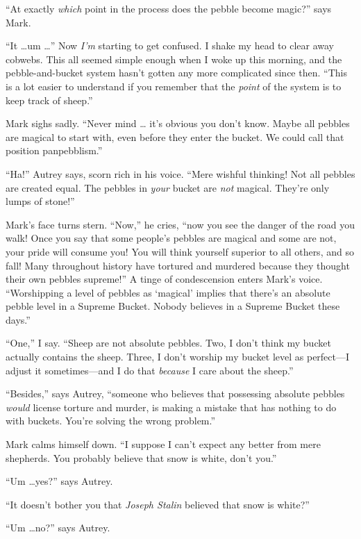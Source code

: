 {
 ``At exactly \textit{which} point in the process
does the pebble become magic?'' says Mark.}

{
 ``It \ldots um \ldots'' Now
\textit{I'm} starting to get confused. I shake my head
to clear away cobwebs. This all seemed simple enough when I woke up
this morning, and the pebble-and-bucket system hasn't
gotten any more complicated since then. ``This is a
lot easier to understand if you remember that the \textit{point} of the
system is to keep track of sheep.''}

{
 Mark sighs sadly. ``Never mind \ldots
it's obvious you don't know. Maybe all
pebbles are magical to start with, even before they enter the bucket.
We could call that position panpebblism.''}

{
 ``Ha!'' Autrey says, scorn rich
in his voice. ``Mere wishful thinking! Not all pebbles
are created equal. The pebbles in \textit{your} bucket are \textit{not}
magical. They're only lumps of
stone!''}

{
 Mark's face turns stern.
``Now,'' he cries,
``now you see the danger of the road you walk! Once
you say that some people's pebbles are magical and some
are not, your pride will consume you! You will think yourself superior
to all others, and so fall! Many throughout history have tortured and
murdered because they thought their own pebbles
supreme!'' A tinge of condescension enters
Mark's voice. ``Worshipping a level of
pebbles as `magical' implies that
there's an absolute pebble level in a Supreme Bucket.
Nobody believes in a Supreme Bucket these days.''}

{
 ``One,'' I say.
``Sheep are not absolute pebbles. Two, I
don't think my bucket actually contains the sheep.
Three, I don't worship my bucket level as perfect---I
adjust it sometimes---and I do that \textit{because} I care about the
sheep.''}

{
 ``Besides,'' says Autrey,
``someone who believes that possessing absolute
pebbles \textit{would} license torture and murder, is making a mistake
that has nothing to do with buckets. You're solving the
wrong problem.''}

{
 Mark calms himself down. ``I suppose I
can't expect any better from mere shepherds. You
probably believe that snow is white, don't
you.''}

{
 ``Um \ldots yes?'' says Autrey.}

{
 ``It doesn't bother you that
\textit{Joseph Stalin} believed that snow is
white?''}

{
 ``Um \ldots no?'' says Autrey.}

